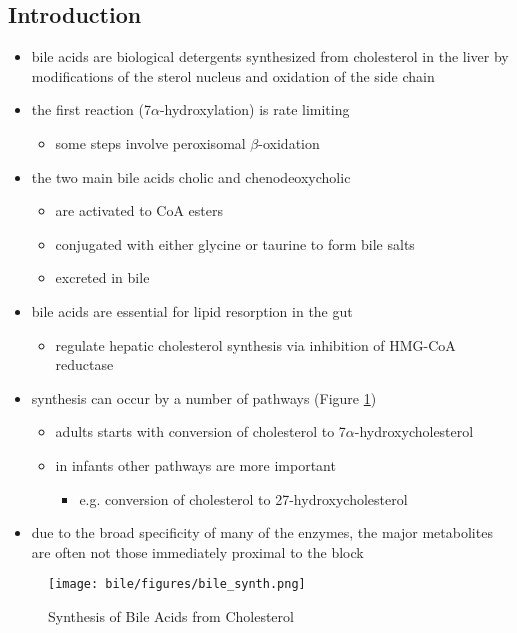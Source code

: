 \documentclass[12pt]{scrartcl}
\begin{document}
\subsection{Introduction}
\label{sec:orgbb3ae06}
\begin{itemize}
\item bile acids are biological detergents synthesized from cholesterol
in the liver by modifications of the sterol nucleus and oxidation of
the side chain
\item the first reaction (7\(\alpha\)-hydroxylation) is rate limiting
\begin{itemize}
\item some steps involve peroxisomal \(\beta\)-oxidation
\end{itemize}
\item the two main bile acids cholic and chenodeoxycholic
\begin{itemize}
\item are activated to CoA esters
\item conjugated with either glycine or taurine to form bile salts
\item excreted in bile
\end{itemize}
\item bile acids are essential for lipid resorption in the gut
\begin{itemize}
\item regulate hepatic cholesterol synthesis via inhibition of HMG-CoA reductase
\end{itemize}
\item synthesis can occur by a number of pathways (Figure \ref{fig:org0f704ce})
\begin{itemize}
\item adults starts with conversion of cholesterol to 7\(\alpha\)-hydroxycholesterol
\item in infants other pathways are more important
\begin{itemize}
\item e.g. conversion of cholesterol to 27-hydroxycholesterol
\end{itemize}
\end{itemize}
\item due to the broad specificity of many of the enzymes, the major
metabolites are often not those immediately proximal to the block
\end{itemize}

\begin{figure}[htbp]
\centering
\texttt{[image: bile/figures/bile\_synth.png]}
\caption{\label{fig:org0f704ce}Synthesis of Bile Acids from Cholesterol}
\end{figure}
\end{document}
